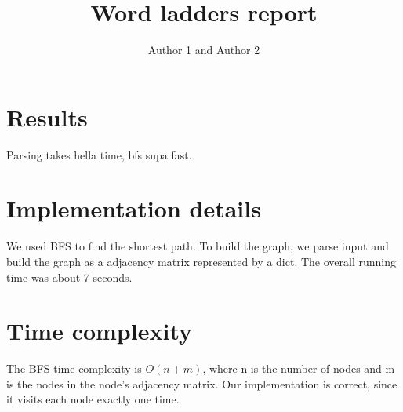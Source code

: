 \documentclass{article}
\title{Word ladders report}
\author{Author 1 and Author 2}
\begin{document}
  \maketitle

  \section{Results}

  Parsing takes hella time, bfs supa fast.

  \section{Implementation details}

  We used BFS to find the shortest path. To build the graph, we parse input and build the graph as a adjacency matrix represented by a dict.
  The overall running time was about 7 seconds. 

  \section{Time complexity}

  The BFS time complexity is $O(n + m)$, where n is the number of nodes and m is the nodes in the node's adjacency matrix. 
  Our implementation is correct, since it visits each node exactly one time. 
\end{document}
